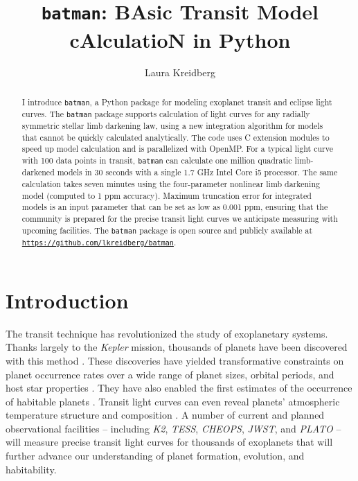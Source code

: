 \documentclass[12pt,preprint]{aastex}
\newcommand*{\blue}{\textcolor{blue}}
\begin{document}
\title{\texttt{batman}: BAsic Transit Model cAlculatioN in Python} 

\author{Laura Kreidberg}



\begin{abstract}
I introduce \texttt{batman}, a Python package for modeling exoplanet transit and eclipse light curves.  The \texttt{batman} package supports calculation of light curves for any radially symmetric stellar limb darkening law, using a new integration algorithm for models that cannot be quickly calculated analytically.  The code uses C extension modules to speed up model calculation and is parallelized with OpenMP.  For a typical light curve with 100 data points in transit, \texttt{batman} can calculate one million quadratic limb-darkened models in 30 seconds with a single 1.7 GHz Intel Core i5 processor.  The same calculation takes seven minutes using the four-parameter nonlinear limb darkening model (computed to 1 ppm accuracy).  Maximum truncation error for integrated models is an input parameter that can be set as low as 0.001 ppm, ensuring that the community is prepared for the precise transit light curves we anticipate measuring with upcoming facilities.  The \texttt{batman} package is open source and publicly available at \texttt{\blue{\url{https://github.com/lkreidberg/batman}}}.
\end{abstract}


\section{Introduction}
The transit technique has revolutionized the study of exoplanetary systems.  Thanks largely to the \emph{Kepler} mission, thousands of planets have been discovered with this method \citep{rowe15}. These discoveries have yielded transformative constraints on planet occurrence rates over a wide range of planet sizes, orbital periods, and host star properties \citep{borucki11, youdin11, howard12,fressin13, dong13, morton14}. They have also enabled the first estimates of the occurrence of habitable planets \citep{traub12, dressing13, petigura13, kopparapu13, foremanmackey14, dressing15}.  Transit light curves can even reveal planets' atmospheric temperature structure and composition \citep[e.g.][]{seager00, charbonneau02, lecavelier08, sing11, deming13, knutson14a, fraine14, kreidberg15}.  A number of current and planned observational facilities -- including \emph{K2}, \emph{TESS}, \emph{CHEOPS}, \emph{JWST}, and \emph{PLATO} -- will measure precise transit light curves for thousands of exoplanets that will further advance our understanding of planet formation, evolution, and habitability.
\end{document}
